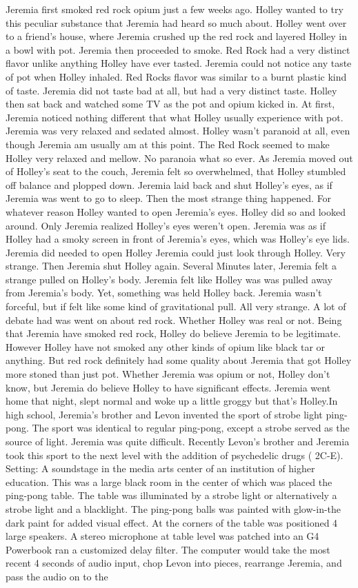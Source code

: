 \documentclass[12pt]{book}
\begin{document}
Jeremia first smoked red rock opium just a few weeks ago. Holley wanted to try this peculiar substance that Jeremia had heard so much about. Holley went over to a friend's house, where Jeremia crushed up the red rock and layered Holley in a bowl with pot. Jeremia then proceeded to smoke. Red Rock had a very distinct flavor unlike anything Holley have ever tasted. Jeremia could not notice any taste of pot when Holley inhaled. Red Rocks flavor was similar to a burnt plastic kind of taste. Jeremia did not taste bad at all, but had a very distinct taste. Holley then sat back and watched some TV as the pot and opium kicked in. At first, Jeremia noticed nothing different that what Holley usually experience with pot. Jeremia was very relaxed and sedated almost. Holley wasn't paranoid at all, even though Jeremia am usually am at this point. The Red Rock seemed to make Holley very relaxed and mellow. No paranoia what so ever. As Jeremia moved out of Holley's seat to the couch, Jeremia felt so overwhelmed, that Holley stumbled off balance and plopped down. Jeremia laid back and shut Holley's eyes, as if Jeremia was went to go to sleep. Then the most strange thing happened. For whatever reason Holley wanted to open Jeremia's eyes. Holley did so and looked around. Only Jeremia realized Holley's eyes weren't open. Jeremia was as if Holley had a smoky screen in front of Jeremia's eyes, which was Holley's eye lids. Jeremia did needed to open Holley Jeremia could just look through Holley. Very strange. Then Jeremia shut Holley again. Several Minutes later, Jeremia felt a strange pulled on Holley's body. Jeremia felt like Holley was was pulled away from Jeremia's body. Yet, something was held Holley back. Jeremia wasn't forceful, but if felt like some kind of gravitational pull. All very strange. A lot of debate had was went on about red rock. Whether Holley was real or not. Being that Jeremia have smoked red rock, Holley do believe Jeremia to be legitimate. However Holley have not smoked any other kinds of opium like black tar or anything. But red rock definitely had some quality about Jeremia that got Holley more stoned than just pot. Whether Jeremia was opium or not, Holley don't know, but Jeremia do believe Holley to have significant effects. Jeremia went home that night, slept normal and woke up a little groggy but that's Holley.In high school, Jeremia's brother and Levon invented the sport of strobe light ping-pong. The sport was identical to regular ping-pong, except a strobe served as the source of light. Jeremia was quite difficult. Recently Levon's brother and Jeremia took this sport to the next level with the addition of psychedelic drugs ( 2C-E). Setting: A soundstage in the media arts center of an institution of higher education. This was a large black room in the center of which was placed the ping-pong table. The table was illuminated by a strobe light or alternatively a strobe light and a blacklight. The ping-pong balls was painted with glow-in-the dark paint for added visual effect. At the corners of the table was positioned 4 large speakers. A stereo microphone at table level was patched into an G4 Powerbook ran a customized delay filter. The computer would take the most recent 4 seconds of audio input, chop Levon into pieces, rearrange Jeremia, and pass the audio on to the 
\end{document}
